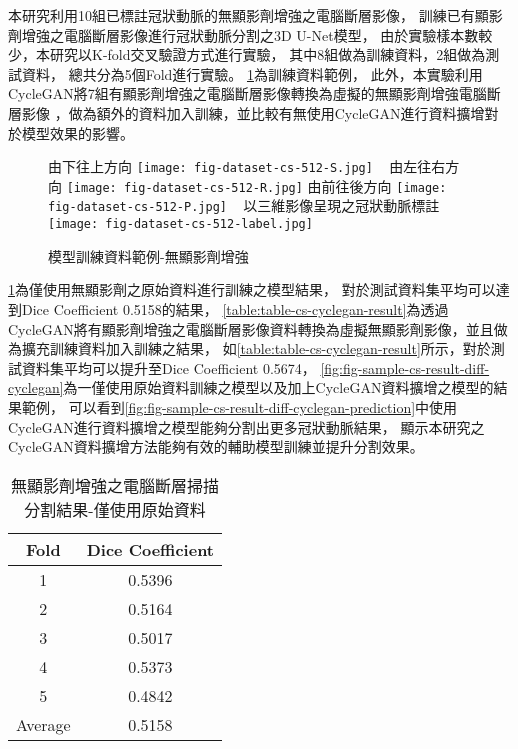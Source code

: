 \documentclass[class=NCU_thesis, crop=false]{standalone}
\begin{document}
本研究利用10組已標註冠狀動脈的無顯影劑增強之電腦斷層影像，
訓練已有顯影劑增強之電腦斷層影像進行冠狀動脈分割之3D U-Net模型，
由於實驗樣本數較少，本研究以K-fold交叉驗證方式進行實驗，
其中8組做為訓練資料，2組做為測試資料，
總共分為5個Fold進行實驗。
\cref{fig:fig-dataset-cs-input-example}為訓練資料範例，
此外，本實驗利用CycleGAN將7組有顯影劑增強之電腦斷層影像轉換為虛擬的無顯影劑增強電腦斷層影像
，做為額外的資料加入訓練，並比較有無使用CycleGAN進行資料擴增對於模型效果的影響。
\begin{figure}[!hbt]
    \centering
    \subcaptionbox
        {由下往上方向
        \label{fig:fig-dataset-cs-512-S}}
        {\texttt{[image: fig-dataset-cs-512-S.jpg]}}
    ~
    \subcaptionbox
        {由左往右方向
        \label{fig:fig-dataset-cs-512-R}}
        {\texttt{[image: fig-dataset-cs-512-R.jpg]}}
    \vspace{\baselineskip} %
    \subcaptionbox
        {由前往後方向
        \label{fig:fig-dataset-cs-512-P}}
        {\texttt{[image: fig-dataset-cs-512-P.jpg]}}
    ~
    \subcaptionbox
        {以三維影像呈現之冠狀動脈標註
        \label{fig:fig-dataset-cs-512-label}}
        {\texttt{[image: fig-dataset-cs-512-label.jpg]}}
    \caption{模型訓練資料範例-無顯影劑增強}
    \label{fig:fig-dataset-cs-input-example}
\end{figure}

\cref{table:table-cs-only-result}為僅使用無顯影劑之原始資料進行訓練之模型結果，
對於測試資料集平均可以達到Dice Coeﬀicient 0.5158的結果，
\cref{table:table-cs-cyclegan-result}為透過CycleGAN將有顯影劑增強之電腦斷層影像資料轉換為虛擬無顯影劑影像，並且做為擴充訓練資料加入訓練之結果，
如\cref{table:table-cs-cyclegan-result}所示，對於測試資料集平均可以提升至Dice Coeﬀicient 0.5674，
\cref{fig:fig-sample-cs-result-diff-cyclegan}為一僅使用原始資料訓練之模型以及加上CycleGAN資料擴增之模型的結果範例，
可以看到\cref{fig:fig-sample-cs-result-diff-cyclegan-prediction}中使用CycleGAN進行資料擴增之模型能夠分割出更多冠狀動脈結果，
顯示本研究之CycleGAN資料擴增方法能夠有效的輔助模型訓練並提升分割效果。

\begin{table}[h]
    \centering
    \caption{無顯影劑增強之電腦斷層掃描分割結果-僅使用原始資料}
    \label{table:table-cs-only-result}
    \begin{tabular}{cc}
    \hline
    Fold & Dice Coeﬀicient \\
    \hline
    1 & 0.5396 \\
    2 & 0.5164 \\
    3 & 0.5017 \\
    4 & 0.5373 \\
    5 & 0.4842 \\
    \hline
    Average & 0.5158 \\
    \hline
    \end{tabular}
\end{table}
\end{document}
